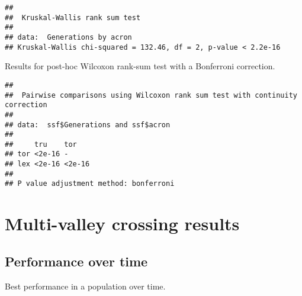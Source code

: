 \documentclass[]{book}
\newenvironment{Shaded}{\begin{snugshade}}{\end{snugshade}}
\newcommand{\CharTok}[1]{\textcolor[rgb]{0.31,0.60,0.02}{#1}}
\newcommand{\CommentTok}[1]{\textcolor[rgb]{0.56,0.35,0.01}{\textit{#1}}}
\newcommand{\DataTypeTok}[1]{\textcolor[rgb]{0.13,0.29,0.53}{#1}}
\newcommand{\KeywordTok}[1]{\textcolor[rgb]{0.13,0.29,0.53}{\textbf{#1}}}
\newcommand{\NormalTok}[1]{#1}
\newcommand{\OperatorTok}[1]{\textcolor[rgb]{0.81,0.36,0.00}{\textbf{#1}}}
\newcommand{\OtherTok}[1]{\textcolor[rgb]{0.56,0.35,0.01}{#1}}
\newcommand{\StringTok}[1]{\textcolor[rgb]{0.31,0.60,0.02}{#1}}
\begin{document}
\begin{verbatim}
## 
##  Kruskal-Wallis rank sum test
## 
## data:  Generations by acron
## Kruskal-Wallis chi-squared = 132.46, df = 2, p-value < 2.2e-16
\end{verbatim}

Results for post-hoc Wilcoxon rank-sum test with a Bonferroni correction.

\begin{Shaded}
\end{Shaded}

\begin{verbatim}
## 
##  Pairwise comparisons using Wilcoxon rank sum test with continuity correction 
## 
## data:  ssf$Generations and ssf$acron 
## 
##     tru    tor   
## tor <2e-16 -     
## lex <2e-16 <2e-16
## 
## P value adjustment method: bonferroni
\end{verbatim}

\hypertarget{multi-valley-crossing-results}{%
\section{Multi-valley crossing results}\label{multi-valley-crossing-results}}

\hypertarget{performance-over-time-1}{%
\subsection{Performance over time}\label{performance-over-time-1}}

Best performance in a population over time.

\begin{Shaded}
\end{Shaded}
\end{document}
